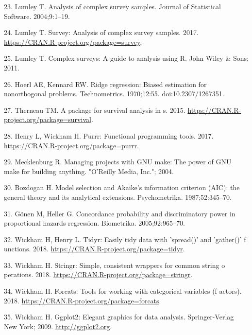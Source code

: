 \documentclass[12pt,oneside]{reedthesis}
\theoremstyle{definition}
\theoremstyle{definition}
\theoremstyle{definition}
\theoremstyle{remark}
\begin{document}
\leavevmode\hypertarget{ref-Lumley_2004}{}%
23. Lumley T. Analysis of complex survey samples. Journal of Statistical
Software. 2004;9:1--19.

\leavevmode\hypertarget{ref-survey_2017}{}%
24. Lumley T. Survey: Analysis of complex survey samples. 2017.
\url{https://CRAN.R-project.org/package=survey}.

\leavevmode\hypertarget{ref-Lumley_2011}{}%
25. Lumley T. Complex surveys: A guide to analysis using R. John Wiley
\& Sons; 2011.

\leavevmode\hypertarget{ref-Hoerl_1970}{}%
26. Hoerl AE, Kennard RW. Ridge regression: Biased estimation for
nonorthogonal problems. Technometrics. 1970;12:55.
doi:\href{https://doi.org/10.2307/1267351}{10.2307/1267351}.

\leavevmode\hypertarget{ref-survival_2015}{}%
27. Therneau TM. A package for survival analysis in s. 2015.
\url{https://CRAN.R-project.org/package=survival}.

\leavevmode\hypertarget{ref-purrr_2017}{}%
28. Henry L, Wickham H. Purrr: Functional programming tools. 2017.
\url{https://CRAN.R-project.org/package=purrr}.

\leavevmode\hypertarget{ref-Mecklenburg_2004}{}%
29. Mecklenburg R. Managing projects with GNU make: The power of GNU
make for building anything. "O'Reilly Media, Inc."; 2004.

\leavevmode\hypertarget{ref-Bozdogan_1987}{}%
30. Bozdogan H. Model selection and Akaike's information criterion
(AIC): the general theory and its analytical extensions. Psychometrika.
1987;52:345--70.

\leavevmode\hypertarget{ref-Gonen_2005}{}%
31. Gönen M, Heller G. Concordance probability and discriminatory power
in proportional hazards regression. Biometrika. 2005;92:965--70.

\leavevmode\hypertarget{ref-tidyr_2018}{}%
32. Wickham H, Henry L. Tidyr: Easily tidy data with 'spread()' and
'gather()' f unctions. 2018.
\url{https://CRAN.R-project.org/package=tidyr}.

\leavevmode\hypertarget{ref-stringr_2018}{}%
33. Wickham H. Stringr: Simple, consistent wrappers for common string o
perations. 2018. \url{https://CRAN.R-project.org/package=stringr}.

\leavevmode\hypertarget{ref-forcats_2018}{}%
34. Wickham H. Forcats: Tools for working with categorical variables (f
actors). 2018. \url{https://CRAN.R-project.org/package=forcats}.

\leavevmode\hypertarget{ref-gglot2_2009}{}%
35. Wickham H. Ggplot2: Elegant graphics for data analysis.
Springer-Verlag New York; 2009. \url{http://ggplot2.org}.
\end{document}
